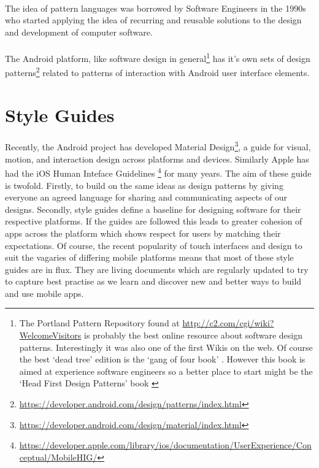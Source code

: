 \documentclass[12pt, a4paper, twoside]{book}
\begin{document}
\paragraph{} The idea of pattern languages was borrowed by Software Engineers in the 1990s who started applying the idea of recurring and reusable solutions to the design and development of computer software.

\paragraph{} The Android platform, like software design in general\footnote{The Portland Pattern Repository found at \url{http://c2.com/cgi/wiki?WelcomeVisitors} is probably the best online resource about software design patterns. Interestingly it was also one of the first Wikis on the web. Of course the best `dead tree' edition is the `gang of four book' \cite{gamma_1994_design.patterns}. However this book is aimed at experience software engineers so a better place to start might be the `Head First Design Patterns' book \cite{freeman_2004_head.first.design.patterns}} has it's own sets of design patterns\footnote{\url{https://developer.android.com/design/patterns/index.html}} related to patterns of interaction with Android user interface elements.



\section{Style Guides}
\paragraph{} Recently, the Android project has developed Material Design\footnote{\url{https://developer.android.com/design/material/index.html}}, a guide for visual, motion, and interaction design across platforms and devices. Similarly Apple has had the iOS Human Inteface Guidelines \footnote{\url{https://developer.apple.com/library/ios/documentation/UserExperience/Conceptual/MobileHIG/}} for many years. The aim of these guide is twofold. Firstly, to build on the same ideas as design patterns by giving everyone an agreed language for sharing and communicating aspects of our designs. Secondly, style guides define a baseline for designing software for their respective platforms. If the guides are followed this leads to greater cohesion of apps across the platform which shows respect for users by matching their expectations. Of course, the recent popularity of touch interfaces and design to suit the vagaries of differing mobile platforms means that most of these style guides are in flux. They are living documents which are regularly updated to try to capture best practise as we learn and discover new and better ways to build and use mobile apps.
\end{document}
